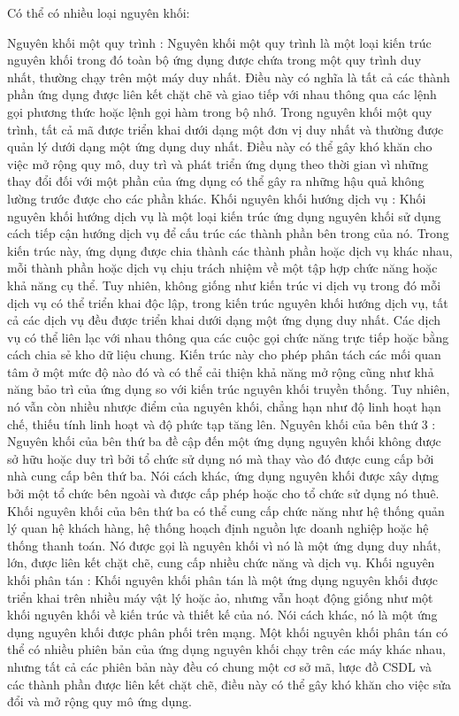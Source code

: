 Có thể có nhiều loại nguyên khối:

Nguyên khối một quy trình : Nguyên khối một quy trình là một loại kiến trúc nguyên khối trong đó toàn bộ ứng dụng được chứa trong một quy trình duy nhất, thường chạy trên một máy duy nhất. Điều này có nghĩa là tất cả các thành phần ứng dụng được liên kết chặt chẽ và giao tiếp với nhau thông qua các lệnh gọi phương thức hoặc lệnh gọi hàm trong bộ nhớ. Trong nguyên khối một quy trình, tất cả mã được triển khai dưới dạng một đơn vị duy nhất và thường được quản lý dưới dạng một ứng dụng duy nhất. Điều này có thể gây khó khăn cho việc mở rộng quy mô, duy trì và phát triển ứng dụng theo thời gian vì những thay đổi đối với một phần của ứng dụng có thể gây ra những hậu quả không lường trước được cho các phần khác.
Khối nguyên khối hướng dịch vụ : Khối nguyên khối hướng dịch vụ là một loại kiến trúc ứng dụng nguyên khối sử dụng cách tiếp cận hướng dịch vụ để cấu trúc các thành phần bên trong của nó. Trong kiến trúc này, ứng dụng được chia thành các thành phần hoặc dịch vụ khác nhau, mỗi thành phần hoặc dịch vụ chịu trách nhiệm về một tập hợp chức năng hoặc khả năng cụ thể. Tuy nhiên, không giống như kiến trúc vi dịch vụ trong đó mỗi dịch vụ có thể triển khai độc lập, trong kiến trúc nguyên khối hướng dịch vụ, tất cả các dịch vụ đều được triển khai dưới dạng một ứng dụng duy nhất. Các dịch vụ có thể liên lạc với nhau thông qua các cuộc gọi chức năng trực tiếp hoặc bằng cách chia sẻ kho dữ liệu chung. Kiến trúc này cho phép phân tách các mối quan tâm ở một mức độ nào đó và có thể cải thiện khả năng mở rộng cũng như khả năng bảo trì của ứng dụng so với kiến trúc nguyên khối truyền thống. Tuy nhiên, nó vẫn còn nhiều nhược điểm của nguyên khối, chẳng hạn như độ linh hoạt hạn chế, thiếu tính linh hoạt và độ phức tạp tăng lên.
Nguyên khối của bên thứ 3 : Nguyên khối của bên thứ ba đề cập đến một ứng dụng nguyên khối không được sở hữu hoặc duy trì bởi tổ chức sử dụng nó mà thay vào đó được cung cấp bởi nhà cung cấp bên thứ ba. Nói cách khác, ứng dụng nguyên khối được xây dựng bởi một tổ chức bên ngoài và được cấp phép hoặc cho tổ chức sử dụng nó thuê. Khối nguyên khối của bên thứ ba có thể cung cấp chức năng như hệ thống quản lý quan hệ khách hàng, hệ thống hoạch định nguồn lực doanh nghiệp hoặc hệ thống thanh toán. Nó được gọi là nguyên khối vì nó là một ứng dụng duy nhất, lớn, được liên kết chặt chẽ, cung cấp nhiều chức năng và dịch vụ.
Khối nguyên khối phân tán : Khối nguyên khối phân tán là một ứng dụng nguyên khối được triển khai trên nhiều máy vật lý hoặc ảo, nhưng vẫn hoạt động giống như một khối nguyên khối về kiến trúc và thiết kế của nó. Nói cách khác, nó là một ứng dụng nguyên khối được phân phối trên mạng. Một khối nguyên khối phân tán có thể có nhiều phiên bản của ứng dụng nguyên khối chạy trên các máy khác nhau, nhưng tất cả các phiên bản này đều có chung một cơ sở mã, lược đồ CSDL và các thành phần được liên kết chặt chẽ, điều này có thể gây khó khăn cho việc sửa đổi và mở rộng quy mô ứng dụng.
